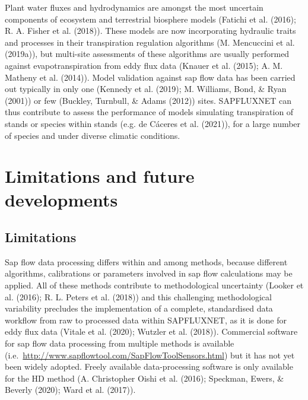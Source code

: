 \documentclass[11pt,twoside]{reedthesis}
\begin{document}
Plant water fluxes and hydrodynamics are amongst the most uncertain
components of ecosystem and terrestrial biosphere models (Fatichi et al.
(2016); R. A. Fisher et al. (2018)). These models are now incorporating
hydraulic traits and processes in their transpiration regulation
algorithms (M. Mencuccini et al. (2019a)), but multi-site assessments of
these algorithms are usually performed against evapotranspiration from
eddy flux data (Knauer et al. (2015); A. M. Matheny et al. (2014)).
Model validation against sap flow data has been carried out typically in
only one (Kennedy et al. (2019); M. Williams, Bond, \& Ryan (2001)) or
few (Buckley, Turnbull, \& Adams (2012)) sites. SAPFLUXNET can thus
contribute to assess the performance of models simulating transpiration
of stands or species within stands (e.g. de Cáceres et al. (2021)), for
a large number of species and under diverse climatic conditions.\par

\section{Limitations and future
developments}\label{limitations-and-future-developments}

\subsection{Limitations}\label{limitations}

Sap flow data processing differs within and among methods, because
different algorithms, calibrations or parameters involved in sap flow
calculations may be applied. All of these methods contribute to
methodological uncertainty (Looker et al. (2016); R. L. Peters et al.
(2018)) and this challenging methodological variability precludes the
implementation of a complete, standardised data workflow from raw to
processed data within SAPFLUXNET, as it is done for eddy flux data
(Vitale et al. (2020); Wutzler et al. (2018)). Commercial software for
sap flow data processing from multiple methods is available
(i.e.~\url{http://www.sapflowtool.com/SapFlowToolSensors.html}) but it
has not yet been widely adopted. Freely available data-processing
software is only available for the HD method (A. Christopher Oishi et
al. (2016); Speckman, Ewers, \& Beverly (2020); Ward et al. (2017)).\par
\end{document}
